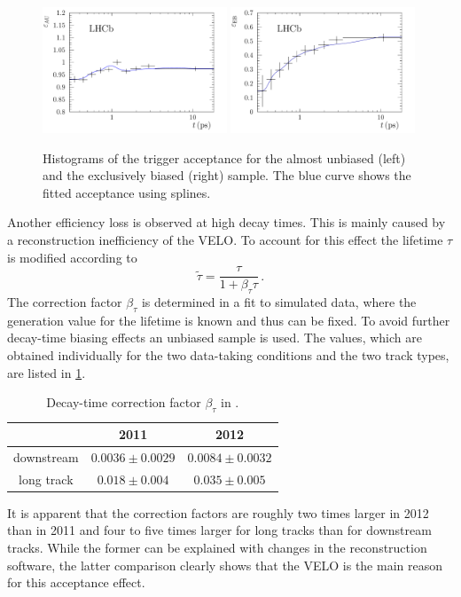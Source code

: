 \begin{figure}[htb]
\includegraphics[width=0.49\textwidth]{06-Bd2JpsiKS/tikz/pdf/Acceptancespline_zoomed_hlt2.pdf}
\includegraphics[width=0.49\textwidth]{06-Bd2JpsiKS/tikz/pdf/Acceptancespline_zoomed_hlt1.pdf}
\caption{Histograms of the trigger acceptance for the almost unbiased (left) and the
exclusively biased (right) sample. The blue curve shows the fitted acceptance
using splines.}
\label{fig:bd2jpsiks:decaytime:acceptance:splines}
\end{figure}

Another efficiency loss is observed at high decay times. This is mainly caused
by a reconstruction inefficiency of the VELO. To account for this effect the
lifetime $\tau$ is modified according to
\begin{equation}
  \widetilde{\tau} = \frac{\tau}{1 + \beta_\tau \tau}\,. 
\end{equation}
The correction factor $\beta_\tau$ is determined in a fit to simulated data,
where the generation value for the lifetime is known and thus can be fixed. To
avoid further decay-time biasing effects an unbiased sample is used. The
values, which are obtained individually for the two data-taking conditions and
the two track types, are listed in
\cref{tab:bd2jpsiks:decaytime:acceptance:beta}.
\begin{table}[htb]
	\centering
	\caption{Decay-time correction factor $\beta_\tau$ in \si{\invps}.}
	\begin{tabular}{ccc}
		\toprule
		 & 2011 & 2012 \\
		\midrule
		downstream & $0.0036\pm0.0029$ & $0.0084\pm0.0032$ \\
		long track & $0.018\pm0.004$   & $0.035\pm0.005$ \\
		\bottomrule
	\end{tabular}
	\label{tab:bd2jpsiks:decaytime:acceptance:beta}
\end{table}
It is apparent that the correction factors are roughly two times larger in
2012 than in 2011 and four to five times larger for long tracks than for
downstream tracks. While the former can be explained with changes in the
reconstruction software, the latter comparison clearly shows that the VELO is
the main reason for this acceptance effect.